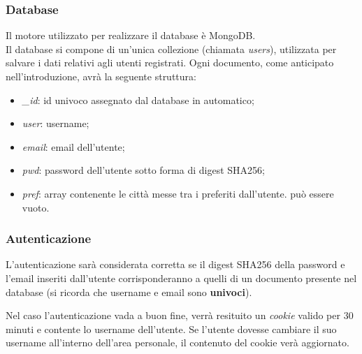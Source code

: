 \subsubsection{Database}

Il motore utilizzato per realizzare il database è MongoDB.\\
Il database si compone di un'unica collezione (chiamata \emph{users}), utilizzata per salvare i dati relativi agli utenti registrati.
Ogni documento, come anticipato nell'introduzione, avrà la seguente struttura:
\begin{itemize}
    \item \emph{\_id}: id univoco assegnato dal database in automatico;
    \item \emph{user}: username;
    \item \emph{email}: email dell'utente;
    \item \emph{pwd}: password dell'utente sotto forma di digest SHA256;
    \item \emph{pref}: array contenente le città messe tra i preferiti dall'utente. può essere vuoto.
\end{itemize}

\subsubsection{Autenticazione}

L'autenticazione sarà considerata corretta se il digest SHA256 della password e l'email inseriti dall'utente corrisponderanno
a quelli di un documento presente nel database (si ricorda che username e email sono \textbf{univoci}).

\vspace{5mm}

Nel caso l'autenticazione vada a buon fine, verrà resituito un \emph{cookie} valido per 30 minuti e contente lo username dell'utente.
Se l'utente dovesse cambiare il suo username all'interno dell'area personale, il contenuto del cookie verà aggiornato.